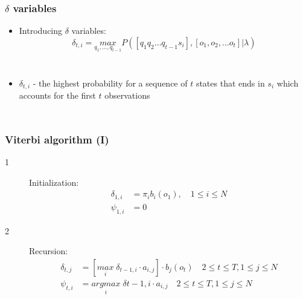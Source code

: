 \documentclass{beamer}
\begin{document}
\begin{frame}
  \frametitle{$\delta$ variables}
  \begin{itemize}
  \item Introducing $\delta$ variables:
    \begin{equation}
      \label{eq:delta-definition}
      \delta_{t,i}=\underset{q_1,\ldots,q_{t-1}}{max} 
      P([q_1 q_2 \ldots q_{t-1} s_i], [o_1, o_2, \ldots o_t] \vert \lambda)
    \end{equation}
  \end{itemize}
  \begin{columns}
    \begin{itemize}
    \item $\delta_{t,i}$ - the highest probability for a sequence of
      $t$ states that ends in $s_i$ which accounts for the first $t$
      observations 
    \end{itemize}
     
  \end{columns}
\end{frame}

\begin{frame}
  \frametitle{Viterbi algorithm (I)}
  \begin{description}
  \item[1] Initialization: \\
    \begin{equation}
      \label{eq:viterbi-initialization}
      \begin{split}
        \delta_{1,i} & = \pi_{i}b_i(o_1), \quad 1 \le i \le N \\
        \psi_{1,i} & = 0
      \end{split}
    \end{equation}
  \item[2] Recursion: \\
    \begin{equation}
      \label{eq:viterbi-recursion}
      \begin{split}
        \delta_{t,j} & = [\underset{i }{max}\; \delta_{t-1,i} \cdot
        a_{i,j}] \cdot b_{j}(o_{t})
        \quad \scriptstyle{2 \le t \le T, 1 \le j \le N} \\
        \psi_{t,i} & = \underset{i}{argmax}\; \delta{t-1,i}\cdot
        a_{i,j} \quad \scriptstyle{2 \le t \le T, 1 \le j \le N}
      \end{split}
    \end{equation}
  \end{description}
\end{frame}
\end{document}
